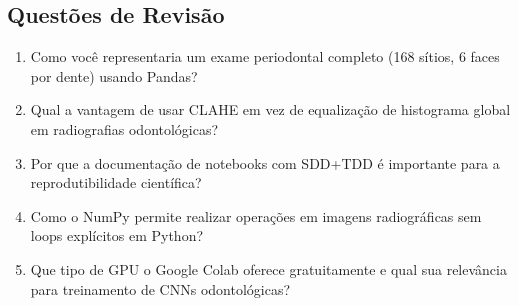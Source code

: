 \subsection{Questões de Revisão}
\begin{enumerate}
    \item Como você representaria um exame periodontal completo (168 sítios, 6 faces por dente) usando Pandas?
    \item Qual a vantagem de usar CLAHE em vez de equalização de histograma global em radiografias odontológicas?
    \item Por que a documentação de notebooks com SDD+TDD é importante para a reprodutibilidade científica?
    \item Como o NumPy permite realizar operações em imagens radiográficas sem loops explícitos em Python?
    \item Que tipo de GPU o Google Colab oferece gratuitamente e qual sua relevância para treinamento de CNNs odontológicas?
\end{enumerate}

